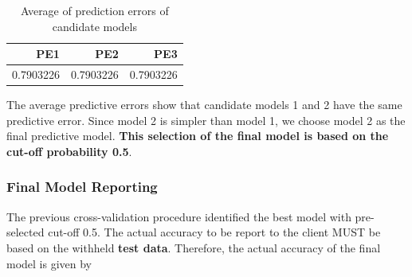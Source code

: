 \documentclass[
]{book}
\newenvironment{Shaded}{\begin{snugshade}}{\end{snugshade}}
\newcommand{\AttributeTok}[1]{\textcolor[rgb]{0.13,0.29,0.53}{#1}}
\newcommand{\FunctionTok}[1]{\textcolor[rgb]{0.13,0.29,0.53}{\textbf{#1}}}
\newcommand{\NormalTok}[1]{#1}
\newcommand{\OtherTok}[1]{\textcolor[rgb]{0.56,0.35,0.01}{#1}}
\newcommand{\SpecialCharTok}[1]{\textcolor[rgb]{0.81,0.36,0.00}{\textbf{#1}}}
\newcommand{\StringTok}[1]{\textcolor[rgb]{0.31,0.60,0.02}{#1}}
\begin{document}
\begin{Shaded}
\end{Shaded}

\begin{table}

\caption{\label{tab:unnamed-chunk-150}Average of prediction errors of candidate models}
\centering
\begin{tabular}[t]{r|r|r}
\hline
PE1 & PE2 & PE3\\
\hline
0.7903226 & 0.7903226 & 0.7903226\\
\hline
\end{tabular}
\end{table}

The average predictive errors show that candidate models 1 and 2 have the same predictive error. Since model 2 is simpler than model 1, we choose model 2 as the final predictive model. \textbf{This selection of the final model is based on the cut-off probability 0.5}.

\hypertarget{final-model-reporting}{%
\subsubsection{Final Model Reporting}\label{final-model-reporting}}

The previous cross-validation procedure identified the best model with pre-selected cut-off 0.5. The actual accuracy to be report to the client MUST be based on the withheld \textbf{test data}. Therefore, the actual accuracy of the final model is given by
\end{document}
